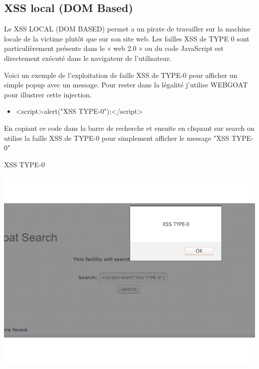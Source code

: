 \bigskip

\subsection{XSS local (DOM Based)}\label{vulnerabilites:web:xss:dom}

Le XSS LOCAL (DOM BASED) permet a un pirate de travailler sur la machine locale de la victime plutôt que sur son site web. Les failles XSS de TYPE 0 sont particulièrement présente dans le « web 2.0 » ou du code JavaScript est directement exécuté dans le navigateur de l'utilisateur.

\begin{flushleft}
Voici un exemple de l'exploitation de faille XSS de TYPE-0 pour afficher un simple popup avec un message. Pour rester dans la légalité j'utilise WEBGOAT pour illustrer cette injection.
\end{flushleft}

\bigskip

\begin{itemize}
\item <script>alert("XSS TYPE-0");</script>
\end{itemize}

\bigskip

\begin{flushleft}
En copiant ce code dans la barre de recherche et ensuite en cliquant sur search on utilise la faille XSS de TYPE-0 pour simplement afficher le message "XSS TYPE-0"
\end{flushleft}



\begin{center}
\caption{XSS TYPE-0}
\includegraphics[scale=0.3]{Web/assets/XSS0.png}
\end{center}

